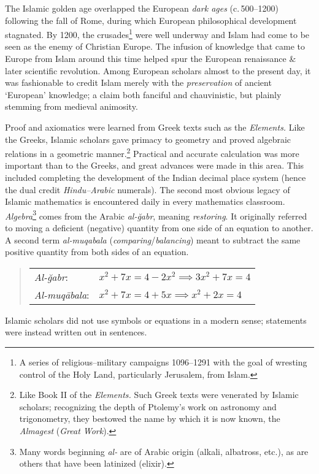 The Islamic golden age overlapped the European \emph{dark ages} (c.\,500--1200) following the fall of Rome, during which European philosophical development stagnated. By 1200, the crusades\footnote{A series of religious--military campaigns 1096--1291 with the goal of wresting control of the Holy Land, particularly Jerusalem, from Islam.} were well underway and Islam had come to be seen as the enemy of Christian Europe. The infusion of knowledge that came to Europe from Islam around this time helped spur the European renaissance \& later scientific revolution. Among European scholars almost to the present day, it was fashionable to credit Islam merely with the \emph{preservation} of ancient `European' knowledge; a claim both fanciful and chauvinistic, but plainly stemming from medieval animosity.

\goodbreak



Proof and axiomatics were learned from Greek texts such as the \emph{Elements.} Like the Greeks, Islamic scholars gave primacy to geometry and proved algebraic relations in a geometric manner.\footnote{Like Book II of the \emph{Elements.} 
Such Greek texts were venerated by Islamic scholars; recognizing the depth of Ptolemy's work on astronomy and trigonometry, they bestowed the name by which it is now known, the \emph{Almagest} (\emph{Great Work}).} Practical and accurate calculation was more important than to the Greeks, and great advances were made in this area. This included completing the development of the Indian decimal place system (hence the dual credit \emph{Hindu--Arabic} numerals).\smallbreak
The second most obvious legacy of Islamic mathematics is encountered daily in every mathematics classroom. \emph{Algebra}\footnote{Many words beginning \emph{al-} are of Arabic origin (alkali, albatross, etc.), as are others that have been latinized (elixir).} comes from the Arabic \emph{al-ğabr}, meaning \emph{restoring}. It originally referred to moving a deficient (negative) quantity from one side of an equation to another. A second term \emph{al-muqabala} (\emph{comparing}/\emph{balancing}) meant to subtract the same positive quantity from both sides of an equation.
\begin{quote}
	\begin{tabular}{l@{\quad}l}
		\emph{Al-ğabr}:&$x^2+7x=4-2x^2\implies 3x^2+7x=4$\\[4pt]
		\emph{Al-muqābala}:&$x^2+7x=4+5x\implies x^2+2x=4$
	\end{tabular}
\end{quote}
Islamic scholars did not use symbols or equations in a modern sense; statements were instead written out in sentences.


